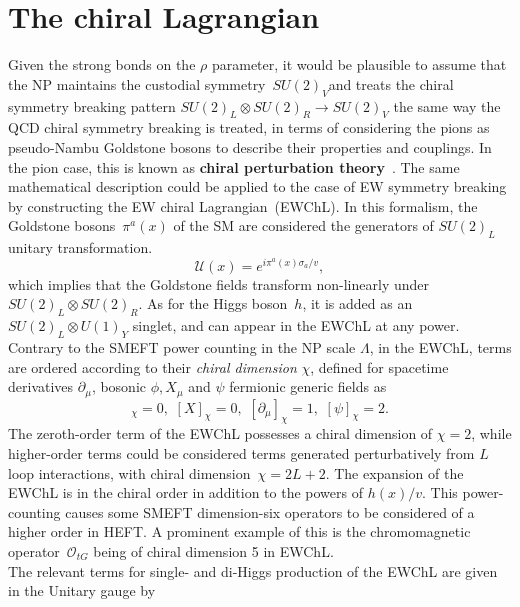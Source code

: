 \section{The chiral Lagrangian \label{sec:chiral}}
Given the strong bonds on the $\rho$ parameter, it would be plausible to assume that the NP maintains the custodial symmetry~$SU(2)_V$and treats the chiral symmetry breaking pattern $SU(2)_L \otimes SU(2)_R \to SU(2)_V$  the same way the QCD chiral symmetry breaking is treated, in terms of considering the pions as pseudo-Nambu Goldstone bosons to describe their properties and couplings. In the pion case, this is known as \textbf{chiral perturbation theory}~\cite{GASSER1984142, GASSER1985465}. The same mathematical description could be applied to the case of EW symmetry breaking by constructing the EW chiral Lagrangian~(EWChL).   In this formalism, the Goldstone bosons~$\pi^a(x)$ of the SM are considered the generators of $SU(2)_L$ unitary transformation.
\begin{equation}
	\mathcal U(x) = e^{ i \pi^a(x)\sigma_a/v }, 
\end{equation}
which implies that the Goldstone fields transform non-linearly under~$SU(2)_L \otimes SU(2)_R$.  As for the Higgs boson~$h$, it is added as an $SU(2)_L \otimes U(1)_Y$ singlet, and can appear in the EWChL at any power. Contrary to the SMEFT power counting in the NP scale $ \Lambda$, in the EWChL, terms are ordered according to their \emph{chiral dimension} $\chi$, defined for spacetime derivatives $\partial_\mu$,  bosonic $\phi, X_\mu$ and $\psi$ fermionic generic fields as~\cite{Buchalla:2013rka,Buchalla:2015wfa}
\begin{equation}
	[\phi]_\chi =0,\,\, [X]_\chi =0,\,\, [\partial_\mu ]_\chi =1, \,\, [\psi]_\chi =2.
\end{equation}
The zeroth-order term of the EWChL possesses a chiral dimension of $\chi=2$, while higher-order terms could be considered terms generated perturbatively from $L$ loop interactions, with chiral dimension~$\chi= 2L+2$. The expansion of the EWChL is in the chiral order in addition to the powers of $h(x)/v$. This power-counting causes some SMEFT dimension-six operators to be considered of a higher order in HEFT. A prominent example of this is the chromomagnetic operator~$\mathcal O_{tG}$ being of chiral dimension 5 in EWChL. \\
The relevant terms for single- and di-Higgs production of the EWChL are given in the Unitary gauge by~\cite{LHCHiggsCrossSectionWorkingGroup:2016ypw,DiVita:2017eyz}
